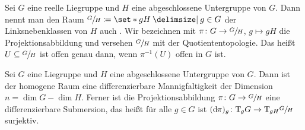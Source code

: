 \begin{definition}[{name=[homogener Raum]}]
	Sei $G$ eine reelle Liegruppe und $H$ eine abgeschlossene Untergruppe von $G$.
	Dann nennt man den Raum $\sfrac{G}{H} \coloneqq \set*{g H \given g \in G}$ der Linksnebenklassen von $H$ auch . 
	Wir bezeichnen mit $\pi \colon G \to \sfrac{G}{H}$, $g \mapsto gH$ die Projektionsabbildung und versehen $\sfrac{G}{H}$ mit der Quotiententopologie.
	Das heißt $U \subseteq \sfrac{G}{H}$ ist offen genau dann, wenn $\pi^{-1}(U)$ offen in $G$ ist.
\end{definition}

\begin{satz}[{name=[homogener Raum ist differenzierbare Mannigfaltigkeit]}]
	Sei $G$ eine Liegruppe und $H$ eine abgeschlossene Untergruppe von $G$.
	Dann ist der homogene Raum eine differenzierbare Mannigfaltigkeit der Dimension $n = \dim G - \dim H$.
	Ferner ist die Projektionsabbildung $\pi \colon G \to \sfrac{G}{H}$ eine differenzierbare Submersion, das heißt für alle $g \in G$ ist $(\mathrm{d}\mkern-1.0mu \pi)_g \colon \mathrm{T}\mkern-0.85mu_g G \to \mathrm{T}\mkern-0.85mu_{gH} \sfrac{G}{H}$ surjektiv.
\end{satz}
